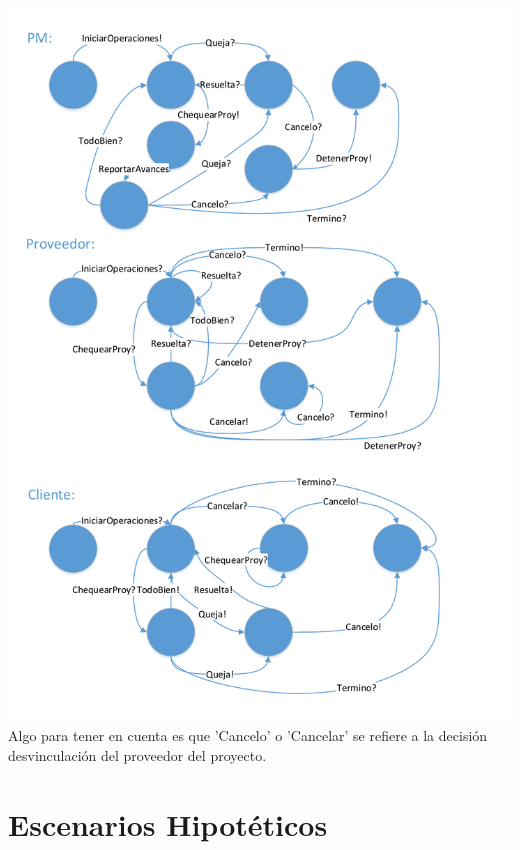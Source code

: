 \documentclass{article}
\theoremstyle{definition}
\theoremstyle{remark}
\begin{document}
\includegraphics[width=\textwidth,height=\textheight,keepaspectratio,page=1]{images/state.pdf}
Algo para tener en cuenta es que 'Cancelo' o 'Cancelar' se refiere a la decisión desvinculación del proveedor del proyecto.

\section{Escenarios Hipotéticos}


\end{document}
